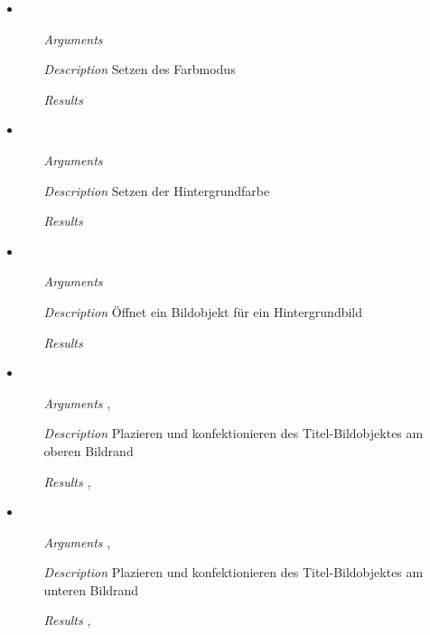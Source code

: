 \begin{description}
\begin{itemize}
\item {}
\begin{enumerate}
\item[\textit{Arguments}] 
\item[\textit{Description}] Setzen des Farbmodus
\item[\textit{Results}] 
\end{enumerate}

\item {}
\begin{enumerate}
\item[\textit{Arguments}] 
\item[\textit{Description}] Setzen der Hintergrundfarbe
\item[\textit{Results}] 
\end{enumerate}

\item {}
\begin{enumerate}
\item[\textit{Arguments}] 
\item[\textit{Description}] \"Offnet ein Bildobjekt f\"ur ein
  Hintergrundbild
\item[\textit{Results}] 
\end{enumerate}

\item {}
\begin{enumerate}
\item[\textit{Arguments}] , 
\item[\textit{Description}] Plazieren und konfektionieren des
  Titel-Bildobjektes am oberen Bildrand
\item[\textit{Results}] ,
\end{enumerate}

\item {}
\begin{enumerate}
\item[\textit{Arguments}] , 
\item[\textit{Description}] Plazieren und konfektionieren des
  Titel-Bildobjektes am unteren Bildrand
\item[\textit{Results}] ,
\end{enumerate}


\end{itemize}
\end{description}
